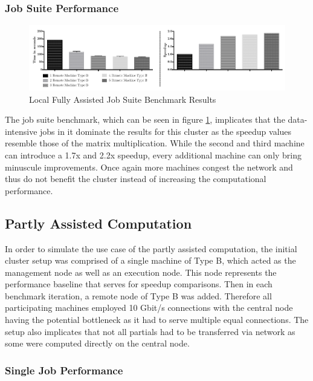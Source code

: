 \subsubsection*{Job Suite Performance}

\begin{figure}[!htb]

	\includegraphics[width=1.0\textwidth]{images/local_fully_assisted_full_benchmark.pdf}
	\centering
	\caption{Local Fully Assisted Job Suite Benchmark Results}
	\label{img:local_fully_assisted_benchmark_results}
\end{figure}

The job suite benchmark, which can be seen in figure \ref{img:local_fully_assisted_benchmark_results}, implicates that the data-intensive jobs in it dominate the results for this cluster as the speedup values resemble those of the matrix multiplication. While the second and third machine can introduce a 1.7x and 2.2x speedup, every additional machine can only bring minuscule improvements. Once again more machines congest the network and thus do not benefit the cluster instead of increasing the computational performance.

\subsection{Partly Assisted Computation}

In order to simulate the use case of the partly assisted computation, the initial cluster setup was comprised of a single machine of Type B, which acted as the management node as well as an execution node. This node represents the performance baseline that serves for speedup comparisons. Then in each benchmark iteration, a remote node of Type B was added. Therefore all participating machines employed 10 Gbit/s connections with the central node having the potential bottleneck as it had to serve multiple equal connections. The setup also implicates that not all partials had to be transferred via network as some were computed directly on the central node.

\subsubsection*{Single Job Performance}
\label{single_job_performance}

